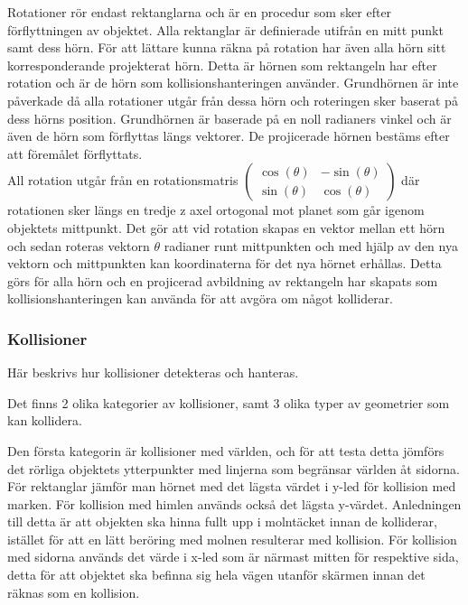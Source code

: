\documentclass[12pt,a4paper]{article}
\newcounter{subsubsubsection}[subsubsection]
\begin{document}
Rotationer rör endast rektanglarna och är en procedur som sker efter förflyttningen av objektet. Alla rektanglar är definierade utifrån en mitt punkt samt dess hörn. För att lättare kunna räkna på rotation har även alla hörn sitt korresponderande projekterat hörn. Detta är hörnen som rektangeln har efter rotation och är de hörn som kollisionshanteringen använder. Grundhörnen är inte påverkade då alla rotationer utgår från dessa hörn och roteringen sker baserat på dess hörns position. Grundhörnen är baserade på en noll radianers vinkel och är även de hörn som förflyttas längs vektorer. De projicerade hörnen bestäms efter att föremålet förflyttats. \\

All rotation utgår från en rotationsmatris 
\begin{math}
	\begin{pmatrix}
	\cos (\theta) & -\sin (\theta) \\
	\sin (\theta) & \cos (\theta)  
	\end{pmatrix}
\end{math}
där rotationen sker längs en tredje z axel ortogonal mot planet som går igenom objektets mittpunkt. Det gör att vid rotation skapas en vektor mellan ett hörn och sedan roteras vektorn $\theta$ radianer runt mittpunkten och med hjälp av den nya vektorn och mittpunkten kan koordinaterna för det nya hörnet erhållas. Detta görs för alla hörn och en projicerad avbildning av rektangeln har skapats som kollisionshanteringen kan använda för att avgöra om något kolliderar. \\


\subsubsection{Kollisioner}
Här beskrivs hur kollisioner detekteras och hanteras.


Det finns 2 olika kategorier av kollisioner, samt 3 olika typer av geometrier som kan kollidera.

Den första kategorin är kollisioner med världen, och för att testa detta jömförs det rörliga objektets ytterpunkter med linjerna som begränsar världen åt sidorna. För rektanglar jämför man hörnet med det lägsta värdet i y-led för kollision med marken. För kollision med himlen används också det lägsta y-värdet. Anledningen till detta är att objekten ska hinna fullt upp i molntäcket innan de kolliderar, istället för att en lätt beröring med molnen resulterar med kollision. För kollision med sidorna används det värde i x-led som är närmast mitten för respektive sida, detta för att objektet ska befinna sig hela vägen utanför skärmen innan det räknas som en kollision.
\end{document}
